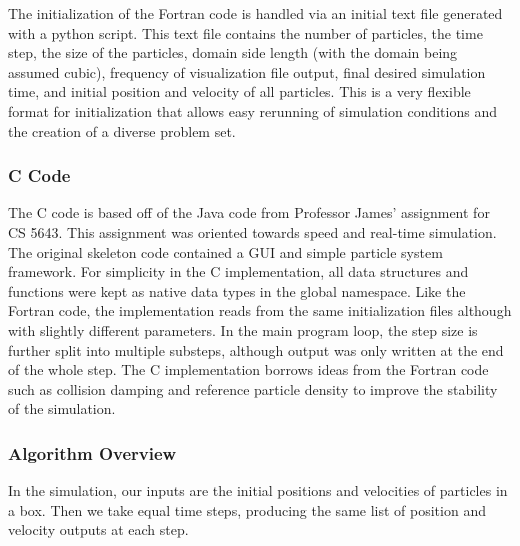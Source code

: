 \documentclass{scrartcl}
\begin{document}
    The initialization of the Fortran code is handled via an initial text file generated with a python script. This text file contains the number of particles, the time step, the size of the particles, domain side length (with the domain being assumed cubic), frequency of visualization file output, final desired simulation time, and initial position and velocity of all particles. This is a very flexible format for initialization that allows easy rerunning of simulation conditions and the creation of a diverse problem set.
    
    
    \subsubsection{C Code}
    
    The C code is based off of the Java code from Professor James' assignment for CS 5643. This assignment was oriented towards speed and real-time simulation. The original skeleton code contained a GUI and simple particle system framework. For simplicity in the C implementation, all data structures and functions were kept as native data types in the global namespace. Like the Fortran code, the implementation reads from the same initialization files although with slightly different parameters. In the main program loop, the step size is further split into multiple substeps, although output was only written at the end of the whole step. The C implementation borrows ideas from the Fortran code such as collision damping and reference particle density to improve the stability of the simulation.
    
    \subsubsection{Algorithm Overview}
        
        In the simulation, our inputs are the initial positions and velocities of particles in a box. Then we take equal time steps, producing the same list of position and velocity outputs at each step.
        
\end{document}
